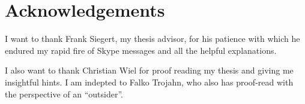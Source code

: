 \thispagestyle{empty}
\section*{Acknowledgements}

I want to thank Frank Siegert, my thesis advisor, for his patience
with which he endured my rapid fire of Skype messages and all the
helpful explanations.

I also want to thank Christian Wiel for proof reading my thesis and
giving me insightful hints. I am indepted to Falko Trojahn, who also
has proof-read with the perspective of an ``outsider''.

